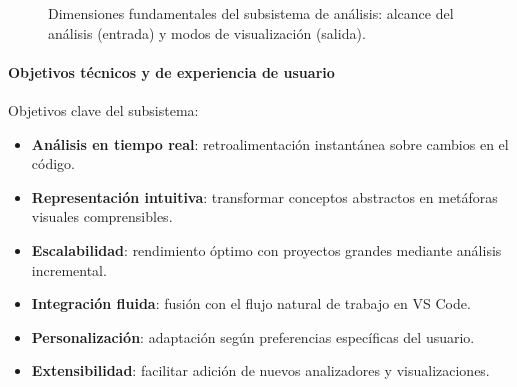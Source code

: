 \documentclass[a4paper, 12pt]{book}
\begin{document}
\begin{figure}[H]
\centering
{}
\caption{Dimensiones fundamentales del subsistema de análisis: alcance del análisis (entrada) y modos de visualización (salida).}
\label{fig:analisis-dimensiones}
\end{figure}

\paragraph{Objetivos técnicos y de experiencia de usuario}
Objetivos clave del subsistema:

\begin{itemize}
  \item \textbf{Análisis en tiempo real}: retroalimentación instantánea sobre cambios en el código.
  \item \textbf{Representación intuitiva}: transformar conceptos abstractos en metáforas visuales comprensibles.
  \item \textbf{Escalabilidad}: rendimiento óptimo con proyectos grandes mediante análisis incremental.
  \item \textbf{Integración fluida}: fusión con el flujo natural de trabajo en VS Code.
  \item \textbf{Personalización}: adaptación según preferencias específicas del usuario.
  \item \textbf{Extensibilidad}: facilitar adición de nuevos analizadores y visualizaciones.
\end{itemize}
\end{document}
